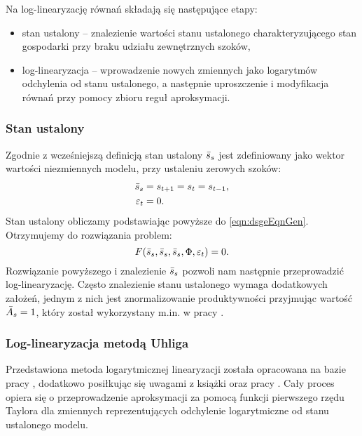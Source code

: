 Na log-linearyzację równań składają się następujące etapy:
\begin{itemize}
    \item stan ustalony -- znalezienie wartości stanu ustalonego charakteryzującego stan gospodarki przy braku udziału zewnętrznych szoków,
    \item log-linearyzacja -- wprowadzenie nowych zmiennych jako logarytmów odchylenia od stanu ustalonego, a następnie uproszczenie i modyfikacja równań przy pomocy zbioru reguł aproksymacji.
\end{itemize}

\subsubsection{Stan ustalony}
\label{sec:steady_state}

Zgodnie z wcześniejszą definicją stan ustalony $\bar{s}_s$ jest zdefiniowany jako wektor wartości niezmiennych modelu, przy ustaleniu zerowych szoków:
\begin{align}
    \bar{s}_s &= s_{t+1} = s_{t} = s_{t-1},\\
    \varepsilon_t &= 0.
\end{align}
Stan ustalony obliczamy podstawiając powyższe do \eqref{eqn:dsgeEqnGen}. Otrzymujemy do rozwiązania problem:
\begin{equation}
    \label{eqn:steadyDsgeEqnGen}
    F(\bar{s}_s, \bar{s}_s, \bar{s}_s, \Phi, \varepsilon_t) = 0.
\end{equation}
Rozwiązanie powyższego i znalezienie $\bar{s}_s$ pozwoli nam następnie przeprowadzić log-linearyzację. Często znalezienie stanu ustalonego wymaga dodatkowych założeń, jednym z nich jest znormalizowanie produktywności przyjmując wartość $\bar{A}_s = 1$, który został wykorzystany m.in. w pracy \cite{costaBook}.

\subsubsection{Log-linearyzacja metodą Uhliga}

Przedstawiona metoda logarytmicznej linearyzacji została opracowana na bazie pracy \cite{uhlig:1995}, dodatkowo posiłkując się uwagami z książki \cite{costaBook} oraz pracy \cite{logLinearization}. Cały proces opiera się o przeprowadzenie aproksymacji za pomocą funkcji pierwszego rzędu Taylora dla zmiennych reprezentujących odchylenie logarytmiczne od stanu ustalonego modelu.

